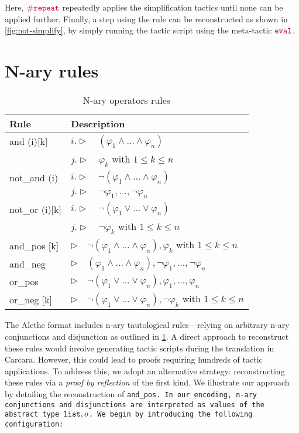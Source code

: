 Here, $\mathop{\mathtt{\textcolor{purple}{\#repeat}}}$ repeatedly applies the simplification tactics until none can be applied further.
Finally, a step using the  rule can be reconstructed as shown in \cref{fig:not-simplify}, by simply running the tactic script using the meta-tactic $\mathop{\mathtt{\textcolor{purple}{eval}}}$.

\section{N-ary rules}

\begin{table}
\centering
\caption{N-ary operators rules}
\begin{tabular}{ll}
Rule & Description \\ \hline
and (i)[k] & $i. \triangleright \quad (\varphi_1 \land \dots \land \varphi_n)$ \\
    & $j. \triangleright \quad \varphi_k $ with $1 \leq k \leq n$\\
not\_and (i) & $i. \triangleright \quad \neg (\varphi_1 \land \dots \land \varphi_n)$ \\
    & $j. \triangleright \quad \neg \varphi_1, \dots, \neg \varphi_n $\\
not\_or (i)[k] & $i. \triangleright \quad \neg (\varphi_1 \lor \dots \lor \varphi_n)$\\
    & $j. \triangleright \quad \neg \varphi_k$ with $1 \leq k \leq n$\\
and\_pos [k] & $\triangleright \quad \neg (\varphi_1 \land \dots \land \varphi_n), \varphi_k$ with $1 \leq k \leq n$ \\
and\_neg & $\triangleright \quad (\varphi_1 \land \dots \land \varphi_n), \neg \varphi_1, \dots, \neg \varphi_n$ \\
or\_pos & $\triangleright \quad \neg (\varphi_1 \lor \dots \lor \varphi_n), \varphi_1, \dots, \varphi_n$ \\
or\_neg [k] & $\triangleright \quad \neg (\varphi_1 \lor \dots \lor \varphi_n), \neg \varphi_k$ with $1 \leq k \leq n$ \\
\end{tabular}
\label{table:nary-rules}
\end{table}

The Alethe format includes n-ary tautological rules—relying on arbitrary n-ary conjunctions and disjunction as outlined in \cref{table:nary-rules}.
A direct approach to reconstruct these rules would involve generating tactic scripts during the translation in Carcara.
However, this could lead to proofs requiring hundreds of tactic applications.
To address this, we adopt an alternative strategy: reconstructing these rules via a \emph{proof by reflection} of the first kind.
We illustrate our approach by detailing the reconstruction of \tt{and\_pos}.
In our encoding, n-ary conjunctions and disjunctions are interpreted as values of the abstract type $\texttt{\upshape{list}},o$.
We begin by introducing the following configuration:

